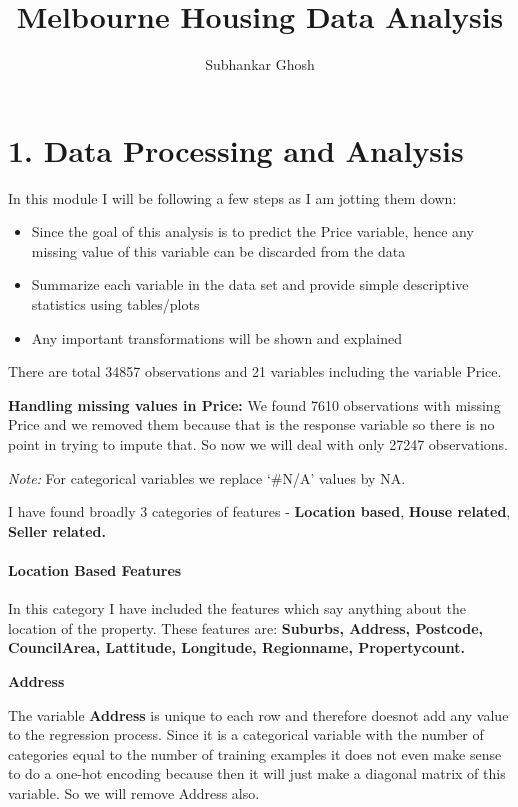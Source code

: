 \documentclass[]{article}
\title{Melbourne Housing Data Analysis}
\author{Subhankar Ghosh}
\date{}
\let\oldparagraph\paragraph
\renewcommand{\paragraph}[1]{\oldparagraph{#1}\mbox{}}
\begin{document}
\maketitle

\section{1. Data Processing and
Analysis}\label{data-processing-and-analysis}

In this module I will be following a few steps as I am jotting them
down:

\begin{itemize}
\item
  Since the goal of this analysis is to predict the Price variable,
  hence any missing value of this variable can be discarded from the
  data
\item
  Summarize each variable in the data set and provide simple descriptive
  statistics using tables/plots
\item
  Any important transformations will be shown and explained
\end{itemize}

There are total 34857 observations and 21 variables including the
variable Price.

\textbf{Handling missing values in Price:} We found 7610 observations
with missing Price and we removed them because that is the response
variable so there is no point in trying to impute that. So now we will
deal with only 27247 observations.

\emph{Note:} For categorical variables we replace `\#N/A' values by NA.

I have found broadly 3 categories of features - \textbf{Location based},
\textbf{House related}, \textbf{Seller related.}

\paragraph{Location Based Features}\label{location-based-features}

In this category I have included the features which say anything about
the location of the property. These features are: \textbf{Suburbs,
Address, Postcode, CouncilArea, Lattitude, Longitude, Regionname,
Propertycount.}

\textbf{Address}

The variable \textbf{Address} is unique to each row and therefore
doesnot add any value to the regression process. Since it is a
categorical variable with the number of categories equal to the number
of training examples it does not even make sense to do a one-hot
encoding because then it will just make a diagonal matrix of this
variable. So we will remove Address also.
\end{document}
